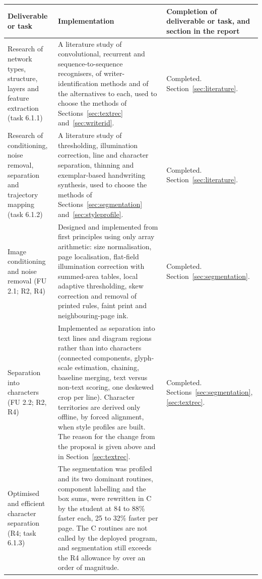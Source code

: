 \begin{table}[!htbp]
\centering
\fontsize{8}{9.4}\selectfont
\setlength{\tabcolsep}{3pt}
\renewcommand{\arraystretch}{1.0}
\begin{tabular}{|p{3.1cm}|p{7.4cm}|p{3.7cm}|}
\hline
\textbf{Deliverable or task} & \textbf{Implementation} & \textbf{Completion of deliverable or task, and section in the report} \\
\hline
Research of network types, structure, layers and feature extraction (task 6.1.1) &
A literature study of convolutional, recurrent and sequence-to-sequence recognisers, of writer-identification methods and of the alternatives to each, used to choose the methods of Sections~\ref{sec:textrec} and~\ref{sec:writerid}. &
Completed. Section~\ref{sec:literature}. \\
\hline
Research of conditioning, noise removal, separation and trajectory mapping (task 6.1.2) &
A literature study of thresholding, illumination correction, line and character separation, thinning and exemplar-based handwriting synthesis, used to choose the methods of Sections~\ref{sec:segmentation} and~\ref{sec:styleprofile}. &
Completed. Section~\ref{sec:literature}. \\
\hline
Image conditioning and noise removal (FU 2.1; R2, R4) &
Designed and implemented from first principles using only array arithmetic: size normalisation, page localisation, flat-field illumination correction with summed-area tables, local adaptive thresholding, skew correction and removal of printed rules, faint print and neighbouring-page ink. &
Completed. Section~\ref{sec:segmentation}. \\
\hline
Separation into characters (FU 2.2; R2, R4) &
Implemented as separation into text lines and diagram regions rather than into characters (connected components, glyph-scale estimation, chaining, baseline merging, text versus non-text scoring, one deskewed crop per line). Character territories are derived only offline, by forced alignment, when style profiles are built. The reason for the change from the proposal is given above and in Section~\ref{sec:textrec}. &
Completed. Sections~\ref{sec:segmentation}, \ref{sec:textrec}. \\
\hline
Optimised and efficient character separation (R4; task 6.1.3) &
The segmentation was profiled and its two dominant routines, component labelling and the box sums, were rewritten in C by the student at 84 to 88\% faster each, 25 to 32\% faster per page. The C routines are not called by the deployed program, and segmentation still exceeds the R4 allowance by over an order of magnitude. &

\end{tabular}
\end{table}
